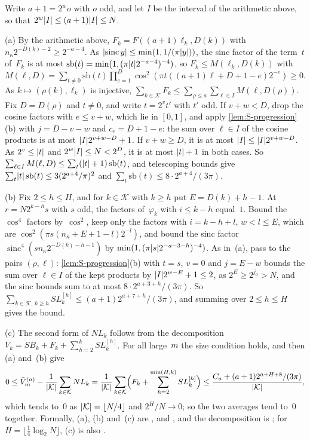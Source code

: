 \begin{outline}
Write $a+1=2^wo$ with $o$ odd, and let $I$ be the interval of the arithmetic above, so that $2^w\lvert I \rvert\le(a+1)\lvert I \rvert\le N$.

(a) By the arithmetic above, $F_k=F((a+1)\ell_k,D(k))$ with $n_\kappa2^{-D(k)-2}\ge2^{-a-4}$. As
$\lvert \operatorname{sinc}y \rvert\le\min(1,1/(\pi\lvert y \rvert))$, the sinc factor of the term~$t$ of~$F_k$ is at most
$\mathrm{sb}(t)=\min(1,(\pi\lvert t \rvert2^{-a-4})^{-4})$, so $F_k\le M(\ell_k,D(k))$ with
$M(\ell,D)=\sum_{t\ne0}\mathrm{sb}(t)\prod_{e=1}^D\cos^2(\pi t((a+1)\ell+D+1-e)2^{-e})\ge0$. As $k\mapsto(\rho(k),\ell_k)$ is
injective, $\sum_{k\in\mathcal K}F_k\le\sum_{\rho\le a}\sum_{\ell\in I}M(\ell,D(\rho))$. Fix $D=D(\rho)$ and $t\ne0$, and
write $t=2^vt'$ with $t'$ odd. If $v+w<D$, drop the cosine factors with $e\le v+w$, which lie in $[0,1]$, and apply
\cref{lem:S-progression}(b) with $j=D-v-w$ and $c_e=D+1-e$: the sum over $\ell\in I$ of the cosine products is at most
$\lvert I \rvert2^{v+w-D}+1$. If $v+w\ge D$, it is at most $\lvert I \rvert\le\lvert I \rvert2^{v+w-D}$. As $2^v\le\lvert t \rvert$ and $2^w\lvert I \rvert\le N<2^D$,
it is at most $\lvert t \rvert+1$ in both cases. So $\sum_{\ell\in I}M(\ell,D)\le\sum_t(\lvert t \rvert+1)\,\mathrm{sb}(t)$, and telescoping
bounds give $\sum_t\lvert t \rvert\,\mathrm{sb}(t)\le3(2^{a+4}/\pi)^2$ and $\sum_t\mathrm{sb}(t)\le8\cdot2^{a+4}/(3\pi)$.

(b) Fix $2\le h\le H$, and for $k\in\mathcal K$ with $k\ge h$ put $E=D(k)+h-1$. At $r=N2^{k-h}s$ with $s$ odd, the factors
of~$\varphi_k$ with $i\le k-h$ equal~$1$. Bound the $\cos^4$ factors by~$\cos^2$, keep only the factors with $i=k-h+l$,
$w<l\le E$, which are $\cos^2(\pi s(n_\kappa+E+1-l)2^{-l})$, and bound the sinc factor
$\operatorname{sinc}^4(sn_\kappa2^{-D(k)-h-1})$ by $\min(1,(\pi\lvert s \rvert2^{-a-3-h})^{-4})$. As in~(a), pass to the pairs
$(\rho,\ell)$: \cref{lem:S-progression}(b) with $t=s$, $v=0$ and $j=E-w$ bounds the sum over $\ell\in I$ of the kept products
by $\lvert I \rvert2^{w-E}+1\le2$, as $2^E\ge2^{j_0}>N$, and the sinc bounds sum to at most $8\cdot2^{a+3+h}/(3\pi)$. So
$\sum_{k\in\mathcal K,\,k\ge h}SL^{[h]}_k\le(a+1)2^{a+7+h}/(3\pi)$, and summing over $2\le h\le H$ gives the bound.

(c) The second form of $NL_k$ follows from the decomposition $V_k=SB_k+F_k+\sum_{h=2}^kSL^{[h]}_k$. For all large~$m$
the size condition holds, and then (a) and~(b) give
\[
  0\le\bar V^{(a)}_m-\frac1{\lvert \mathcal K \rvert}\sum_{k\in\mathcal K}NL_k
  =\frac1{\lvert \mathcal K \rvert}\sum_{k\in\mathcal K}\Bigl(F_k+\sum_{h=2}^{\min(H,k)}SL^{[h]}_k\Bigr)
  \le\frac{C_a+(a+1)2^{a+H+8}/(3\pi)}{\lvert \mathcal K \rvert},
\]
which tends to~$0$ as $\lvert \mathcal K \rvert=\lfloor N/4\rfloor$ and $2^H/N\to0$; so the two averages tend to~$0$ together.
Formally, (a), (b) and~(c) are ,  and
, and the decomposition is ; for
$H=\lfloor\frac14\log_2N\rfloor$, (c) is also .
\end{outline}

